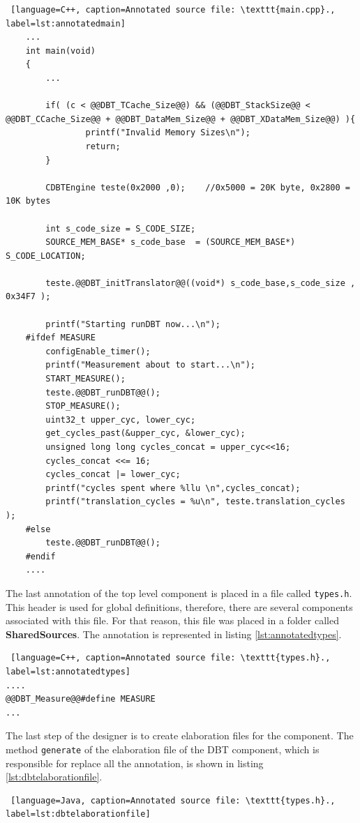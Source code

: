 \documentclass[12pt]{article}
\begin{document}
{\begin{lstlisting} [language=C++, caption=Annotated source file: \texttt{main.cpp}., label=lst:annotatedmain]
	... 
    int main(void)
	{
		...
        
  		if( (c < @@DBT_TCache_Size@@) && (@@DBT_StackSize@@ < @@DBT_CCache_Size@@ + @@DBT_DataMem_Size@@ + @@DBT_XDataMem_Size@@) ){
                printf("Invalid Memory Sizes\n");
                return;
  		}
  			
  		CDBTEngine teste(0x2000 ,0);	//0x5000 = 20K byte, 0x2800 = 10K bytes

  		int s_code_size = S_CODE_SIZE;
  		SOURCE_MEM_BASE* s_code_base  = (SOURCE_MEM_BASE*) S_CODE_LOCATION;

  		teste.@@DBT_initTranslator@@((void*) s_code_base,s_code_size , 0x34F7 );

  		printf("Starting runDBT now...\n");
	#ifdef MEASURE
        configEnable_timer();
        printf("Measurement about to start...\n");
        START_MEASURE();
        teste.@@DBT_runDBT@@();
        STOP_MEASURE();
        uint32_t upper_cyc, lower_cyc;
        get_cycles_past(&upper_cyc, &lower_cyc);
        unsigned long long cycles_concat = upper_cyc<<16;
        cycles_concat <<= 16;
        cycles_concat |= lower_cyc;
        printf("cycles spent where %llu \n",cycles_concat);
        printf("translation_cycles = %u\n", teste.translation_cycles );
	#else
 	 	teste.@@DBT_runDBT@@();
	#endif
    ....
\end{lstlisting}

The last annotation of the top level component is placed in a file called \texttt{types.h}. This header is used for global definitions, therefore, there are several components associated with this file. For that reason, this file was placed in a folder called \textbf{SharedSources}. The annotation is represented in listing \ref{lst:annotatedtypes}.

\begin{lstlisting} [language=C++, caption=Annotated source file: \texttt{types.h}., label=lst:annotatedtypes]
....
@@DBT_Measure@@#define MEASURE
...
\end{lstlisting}

The last step of the designer is to create elaboration files for the component. The method \texttt{generate} of the elaboration file of the DBT component,  which is responsible for replace all the annotation, is shown in listing \ref{lst:dbtelaborationfile}.

\begin{lstlisting} [language=Java, caption=Annotated source file: \texttt{types.h}., label=lst:dbtelaborationfile]


\end{lstlisting}}
\end{document}
